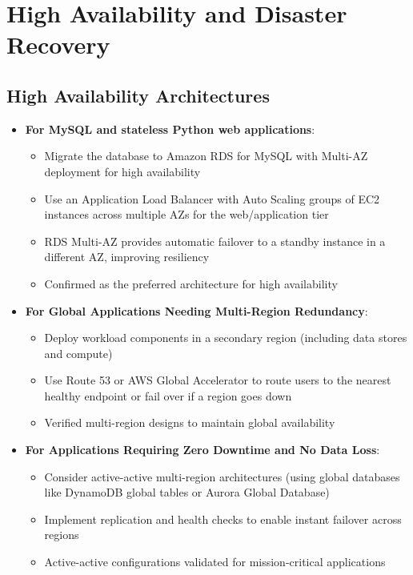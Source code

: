 \documentclass[11pt,a4paper]{report}
\begin{document}
\chapter{High Availability and Disaster Recovery}



\section{High Availability Architectures}

\begin{itemize}
  \item \textbf{For MySQL and stateless Python web applications}:
\begin{itemize}
  \item Migrate the database to Amazon RDS for MySQL with Multi-AZ deployment for high availability
  \item Use an Application Load Balancer with Auto Scaling groups of EC2 instances across multiple AZs for the web/application tier
  \item RDS Multi-AZ provides automatic failover to a standby instance in a different AZ, improving resiliency
  \item Confirmed as the preferred architecture for high availability
\end{itemize}
  \item \textbf{For Global Applications Needing Multi-Region Redundancy}:
\begin{itemize}
  \item Deploy workload components in a secondary region (including data stores and compute)
  \item Use Route 53 or AWS Global Accelerator to route users to the nearest healthy endpoint or fail over if a region goes down
  \item Verified multi-region designs to maintain global availability
\end{itemize}
  \item \textbf{For Applications Requiring Zero Downtime and No Data Loss}:
\begin{itemize}
  \item Consider active-active multi-region architectures (using global databases like DynamoDB global tables or Aurora Global Database)
  \item Implement replication and health checks to enable instant failover across regions
  \item Active-active configurations validated for mission-critical applications

\end{itemize}
\end{itemize}
\end{document}

